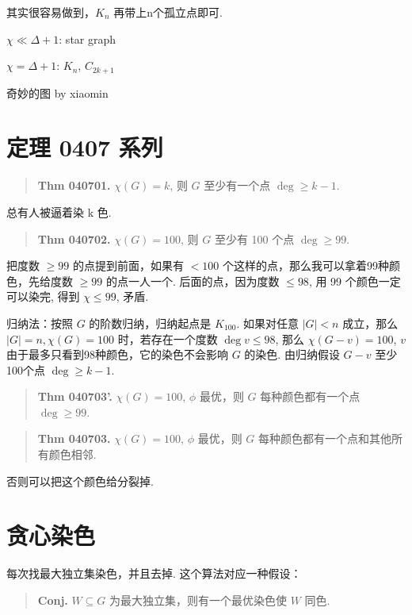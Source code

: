 其实很容易做到，$K_n$ 再带上n个孤立点即可.

$\chi\ll\Delta+1$: star graph

$\chi=\Delta+1$: $K_n$, $C_{2k+1}$

奇妙的图 by xiaomin


\section{定理 0407 系列}

\begin{quotation}
\textbf{Thm 040701.} $\chi(G)=k$, 则 $G$ 至少有一个点 $\deg\geq k-1$.
\end{quotation}

总有人被逼着染 k 色.

\begin{quotation}
\textbf{Thm 040702.} $\chi(G)=100$, 则 $G$ 至少有 100 个点 $\deg\geq99$.
\end{quotation}

把度数 $\geq99$ 的点提到前面，如果有 $<100$ 个这样的点，那么我可以拿着99种颜色，先给度数 $\geq 99$ 的点一人一个. 后面的点，因为度数 $\leq 98$, 用 99 个颜色一定可以染完, 得到 $\chi\leq99$, 矛盾.

归纳法：按照 $G$ 的阶数归纳，归纳起点是 $K_{100}$. 如果对任意 $|G|<n$ 成立，那么 $|G|=n,\chi(G)=100$ 时，若存在一个度数 $\deg v\leq98$, 那么 $\chi(G-v)=100$, $v$ 由于最多只看到98种颜色，它的染色不会影响 $G$ 的染色. 由归纳假设 $G-v$ 至少100个点 $\deg\geq k-1$.

\begin{quotation}
\textbf{Thm 040703'.} $\chi(G)=100$, $\phi$ 最优，则 $G$ 每种颜色都有一个点 $\deg\geq 99$.
\end{quotation}

\begin{quotation}
\textbf{Thm 040703.} $\chi(G)=100$, $\phi$ 最优，则 $G$ 每种颜色都有一个点和其他所有颜色相邻.
\end{quotation}

否则可以把这个颜色给分裂掉.

\section{贪心染色}

每次找最大独立集染色，并且去掉. 这个算法对应一种假设：

\begin{quotation}
\textbf{Conj.} $W\subseteq G$ 为最大独立集，则有一个最优染色使 $W$ 同色.
\end{quotation}

